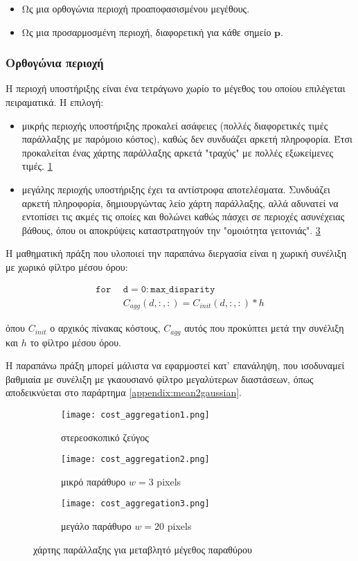 \begin{itemize}
	\item Ως μια ορθογώνια περιοχή προαποφασισμένου μεγέθους.
	\item Ως μια προσαρμοσμένη περιοχή, διαφορετική για κάθε σημείο $\mathbf{p}$.
\end{itemize}

\subsubsection{Ορθογώνια περιοχή}
Η περιοχή υποστήριξης είναι ένα τετράγωνο χωρίο το μέγεθος του οποίου επιλέγεται πειραματικά. Η επιλογή: 

\begin{itemize}
	\item μικρής περιοχής υποστήριξης προκαλεί ασάφειες (πολλές διαφορετικές τιμές παράλλαξης με παρόμοιο κόστος), καθώς δεν συνδυάζει αρκετή πληροφορία. Έτσι προκαλείται ένας χάρτης παράλλαξης αρκετά "τραχύς" με πολλές εξωκείμενες τιμές. \ref{fig:small_window}
	\item μεγάλης περιοχής υποστήριξης έχει τα αντίστροφα αποτελέσματα. Συνδυάζει αρκετή πληροφορία, δημιουργώντας λείο χάρτη παράλλαξης, αλλά αδυνατεί να εντοπίσει τις ακμές τις οποίες και θολώνει καθώς πάσχει σε περιοχές ασυνέχειας βάθους, όπου οι αποκρύψεις καταστρατηγούν την "ομοιότητα γειτονιάς". \ref{fig:large_window}
\end{itemize}

Η μαθηματική πράξη που υλοποιεί την παραπάνω διεργασία είναι η χωρική συνέλιξη με χωρικό φίλτρο μέσου όρου:

\begin{align*}
	\mathtt{for} \: \: & \mathtt{d = 0:max\_disparity} \\
	& C_{agg}(d,:,:) = C_{init}(d,:,:) \ast h
\end{align*}



όπου $C_{init}$ ο αρχικός πίνακας κόστους, $C_{agg}$ αυτός που προκύπτει μετά την συνέλιξη και $h$ το φίλτρο μέσου όρου.

Η παραπάνω πράξη μπορεί μάλιστα να εφαρμοστεί κατ' επανάληψη, που ισοδυναμεί βαθμιαία με συνέλιξη με γκαουσιανό φίλτρο μεγαλύτερων διαστάσεων, όπως αποδεικνύεται στο παράρτημα \ref{appendix:mean2gaussian}.

\begin{figure}
	\centering
	\begin{subfigure}{.33\textwidth}
		\texttt{[image: cost\_aggregation1.png]}
		\caption{στερεοσκοπικό ζεύγος}
	\end{subfigure}
	\begin{subfigure}{.33\textwidth}
		\texttt{[image: cost\_aggregation2.png]}
		\caption{μικρό παράθυρο $w=3$ pixels}
		\label{fig:small_window}
	\end{subfigure}
		\begin{subfigure}{.33\textwidth}
		\texttt{[image: cost\_aggregation3.png]}
		\caption{μεγάλο παράθυρο $w=20$ pixels}
		\label{fig:large_window}
	\end{subfigure}
	\caption{χάρτης παράλλαξης για μεταβλητό μέγεθος παραθύρου}
\end{figure}


